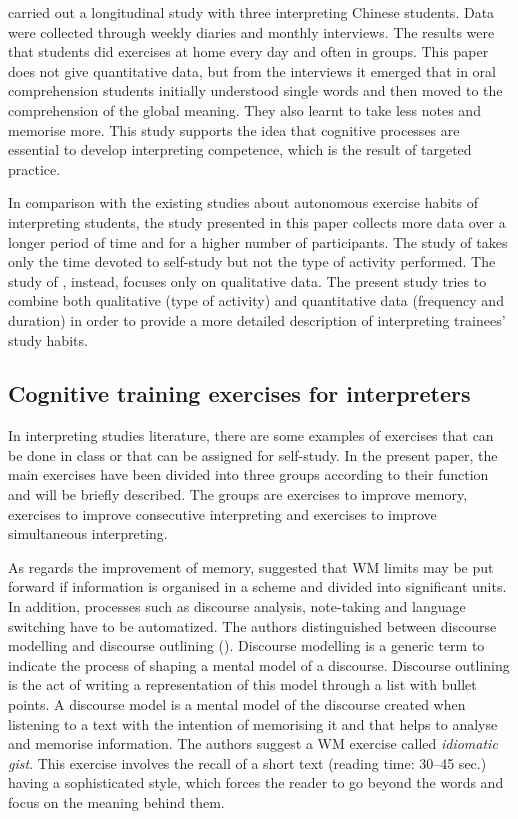 \documentclass[output=paper]{../langscibook}
\begin{document}
\citet{Wang2016} carried out a longitudinal study with three interpreting Chinese students. Data were collected through weekly diaries and monthly interviews. The results were that students did exercises at home every day and often in groups. This paper does not give quantitative data, but from the interviews it emerged that in oral comprehension students initially understood single words and then moved to the comprehension of the global meaning. They also learnt to take less notes and memorise more. This study supports the idea that cognitive processes are essential to develop interpreting competence, which is the result of targeted practice.

In comparison with the existing studies about autonomous exercise habits of interpreting students, the study presented in this paper collects more data over a longer period of time and for a higher number of participants. The study of \citet{Fan2012} takes only the time devoted to self-study but not the type of activity performed. The study of \citet{Wang2016}, instead, focuses only on qualitative data. The present study tries to combine both qualitative (type of activity) and quantitative data (frequency and duration) in order to provide a more detailed description of interpreting trainees’ study habits.



\subsection{Cognitive training exercises for interpreters}
\label{sec:ghiselli:2.3}


In interpreting studies literature, there are some examples of exercises that can be done in class or that can be assigned for self-study. In the present paper, the main exercises have been divided into three groups according to their function and will be briefly described. The groups are exercises to improve memory, exercises to improve consecutive interpreting and exercises to improve simultaneous interpreting.

As regards the improvement of memory, \citet{SettonDawrant2016b} suggested that WM limits may be put forward if information is organised in a scheme and divided into significant units. In addition, processes such as discourse analysis, note-taking and language switching have to be automatized. The authors distinguished between discourse modelling and discourse outlining (\citealt{SettonDawrant2016a}). Discourse modelling is a generic term to indicate the process of shaping a mental model of a discourse. Discourse outlining is the act of writing a representation of this model through a list with bullet points. A discourse model is a mental model of the discourse created when listening to a text with the intention of memorising it and that helps to analyse and memorise information. The authors suggest a WM  exercise called \emph{idiomatic gist}. This exercise involves the recall of a short text (reading time: 30--45 sec.) having a sophisticated style, which forces the reader to go beyond the words and focus on the meaning behind them.
\end{document}

